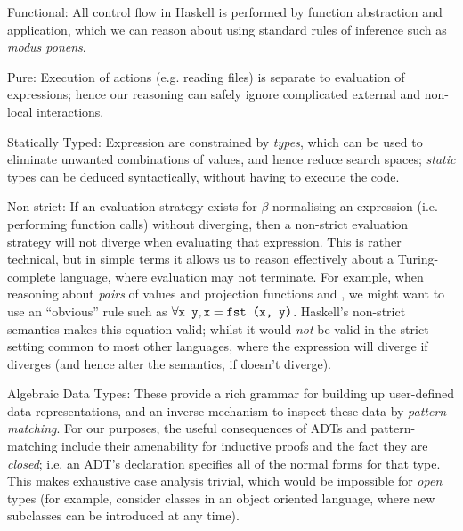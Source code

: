 \begin{description}

\item{Functional}: All control flow in Haskell is performed by function abstraction and application, which we can reason about using standard rules of inference such as \emph{modus ponens}.

\item{Pure}: Execution of actions (e.g. reading files) is separate to evaluation of expressions; hence our reasoning can safely ignore complicated external and non-local interactions.

\item{Statically Typed}: Expression are constrained by \emph{types}, which can be used to eliminate unwanted combinations of values, and hence reduce search spaces; \emph{static} types can be deduced syntactically, without having to execute the code.

\item{Non-strict}: If an evaluation strategy exists for $\beta$-normalising an expression (i.e. performing function calls) without diverging, then a non-strict evaluation strategy will not diverge when evaluating that expression. This is rather technical, but in simple terms it allows us to reason effectively about a Turing-complete language, where evaluation may not terminate. For example, when reasoning about \emph{pairs} of values  and projection functions  and , we might want to use an ``obvious'' rule such as $\forall \text{\texttt{x y}}, \text{\texttt{x}} = \text{\texttt{fst (x, y)}}$. Haskell's non-strict semantics makes this equation valid; whilst it would \emph{not} be valid in the strict setting common to most other languages, where the expression  will diverge if  diverges (and hence alter the semantics, if  doesn't diverge).

\item{Algebraic Data Types}: These provide a rich grammar for building up user-defined data representations, and an inverse mechanism to inspect these data by \emph{pattern-matching}. For our purposes, the useful consequences of ADTs and pattern-matching include their amenability for inductive proofs and the fact they are \emph{closed}; i.e. an ADT's declaration specifies all of the normal forms for that type. This makes exhaustive case analysis trivial, which would be impossible for \emph{open} types (for example, consider classes in an object oriented language, where new subclasses can be introduced at any time).


\end{description}
